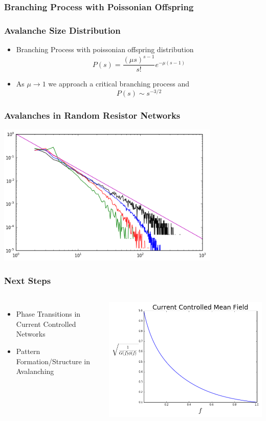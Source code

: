 \documentclass[mathserif]{beamer}
\begin{document}
\begin{frame}
\frametitle{Branching Process with Poissonian Offspring}




\end{frame}
\begin{frame}
\frametitle{Avalanche Size Distribution}
\begin{itemize}
\item<1-> Branching Process with poissonian offspring distribution
$$P(s) = \frac{(\mu s)^{s-1}}{s!} e^{-\mu(s-1)}$$
\item As $\mu\to 1$ we approach a critical branching process and
$$P(s) \sim s^{-3/2}$$
\end{itemize}
\end{frame}

\begin{frame}
\frametitle{Avalanches in Random Resistor Networks}
\includegraphics[width=0.8\textwidth]{Avalanches_p6.png}

\end{frame}

\begin{frame}
\frametitle{Next Steps}
\begin{columns}
\begin{itemize}
\item Phase Transitions in Current Controlled Networks
\item Pattern Formation/Structure in Avalanching
\end{itemize}
\includegraphics[width=\textwidth]{Current_MF.png}

\end{columns}
\end{frame}
\end{document}
